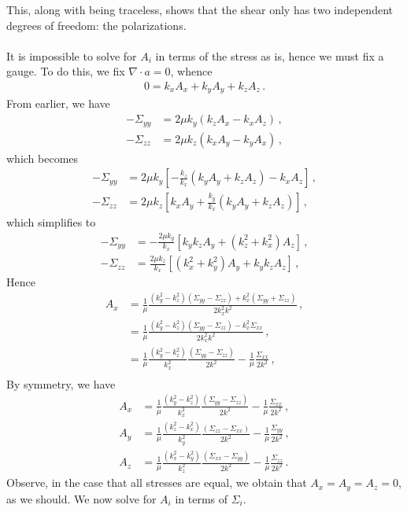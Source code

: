 \documentclass{article}
\newcommand*\p[1]{\left(#1\right)}
\newcommand*\ps[1]{\left[#1\right]}
\newcommand*\f[2]{\frac{#1}{#2}}
\begin{document}
This, along with being traceless, shows that the shear only has two independent degrees of freedom: the polarizations.
\\\\
It is impossible to solve for $A_i$ in terms of the stress as is, hence we must fix a gauge. To do this, we fix $\nabla\cdot a=0$, whence
\begin{align}
0=k_xA_x+k_yA_y+k_zA_z\,.
\end{align}
From earlier, we have
\begin{align}
-\Sigma_{yy}&=2\mu k_y(k_z A_x-k_x A_z)\,,\\
-\Sigma_{zz}&=2\mu k_z(k_x A_y-k_y A_x)\,,
\end{align}
which becomes
\begin{align}
-\Sigma_{yy}&=2\mu k_y\ps{-\f{k_z}{k_x} \p{k_yA_y+k_zA_z}-k_x A_z}\,,\\
-\Sigma_{zz}&=2\mu k_z\ps{k_x A_y+\f{k_y}{k_x} \p{k_yA_y+k_zA_z}}\,,
\end{align}
which simplifies to
\begin{align}
-\Sigma_{yy}&=-\f{2\mu k_y}{k_x}\ps{k_y k_z A_y+\p{k_z^2+k_x^2} A_z}\,,\\
-\Sigma_{zz}&=\f{2\mu k_z}{k_x}\ps{\p{k_x^2 + k_y^2}A_y+k_yk_zA_z}\,,
\end{align}
Hence
\begin{align}
A_x&=\f1\mu\f{(k_y^2-k_z^2)(\Sigma_{yy}-\Sigma_{zz})+k_x^2(\Sigma_{yy}+\Sigma_{zz})}{2k_x^2k^2}\,,\\
&=\f1\mu\f{(k_y^2-k_z^2)(\Sigma_{yy}-\Sigma_{zz})-k_x^2\Sigma_{xx}}{2k_x^2k^2}\,,\\
&=\f1\mu\f{(k_y^2-k_z^2)}{k_x^2}\f{(\Sigma_{yy}-\Sigma_{zz})}{2k^2}-\f1\mu\f{\Sigma_{xx}}{2k^2}\,,\\
\end{align}
By symmetry, we have
\begin{align}
A_x&=\f1\mu\f{(k_y^2-k_z^2)}{k_x^2}\f{(\Sigma_{yy}-\Sigma_{zz})}{2k^2}-\f1\mu\f{\Sigma_{xx}}{2k^2}\,,\\
A_y&=\f1\mu\f{(k_z^2-k_x^2)}{k_y^2}\f{(\Sigma_{zz}-\Sigma_{xx})}{2k^2}-\f1\mu\f{\Sigma_{yy}}{2k^2}\,,\\
A_z&=\f1\mu\f{(k_x^2-k_y^2)}{k_z^2}\f{(\Sigma_{xx}-\Sigma_{yy})}{2k^2}-\f1\mu\f{\Sigma_{zz}}{2k^2}\,.
\end{align}
Observe, in the case that all stresses are equal, we obtain that $A_x=A_y=A_z=0$, as we should.
We now solve for $A_i$ in terms of $\Sigma_{i}$.
\\\\
\end{document}
